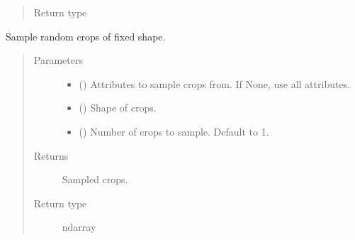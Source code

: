 \documentclass[letterpaper,10pt,english]{sphinxmanual}
\begin{document}
\begin{fulllineitems}
\begin{fulllineitems}
\begin{quote}
\begin{description}
\item[{Return type}] \leavevmode
{\hyperref[\detokenize{api/base_classes:geology.src.base_spatial.SpatialComponent}]{}}

\end{description}\end{quote}

\end{fulllineitems}


\begin{fulllineitems}
\label{\detokenize{api/states:geology.src.States.sample_crops}}
Sample random crops of fixed shape.
\begin{quote}\begin{description}
\item[{Parameters}] \leavevmode\begin{itemize}
\item {} 
 (\sphinxstyleliteralemphasis{\sphinxupquote{, }}) \textendash{} Attributes to sample crops from. If None, use all attributes.

\item {} 
 () \textendash{} Shape of crops.

\item {} 
 (\sphinxstyleliteralemphasis{\sphinxupquote{, }}) \textendash{} Number of crops to sample. Default to 1.

\end{itemize}

\item[{Returns}] \leavevmode
{} \textendash{} Sampled crops.

\item[{Return type}] \leavevmode
ndarray


\end{description}
\end{quote}
\end{fulllineitems}
\end{fulllineitems}
\end{document}
